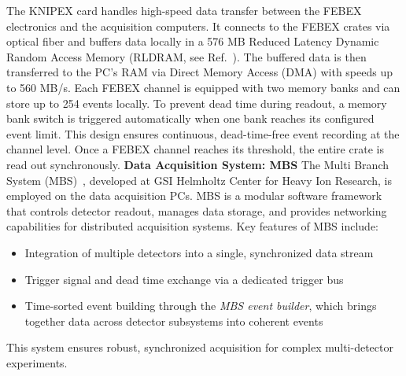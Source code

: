 The KNIPEX card handles high-speed data transfer between the FEBEX electronics and the acquisition computers. It connects to the FEBEX crates via optical fiber and buffers data locally in a 576 MB Reduced Latency Dynamic Random Access Memory (RLDRAM, see Ref.~\cite{jacob2008memory}). The buffered data is then transferred to the PC’s RAM via Direct Memory Access (DMA) with speeds up to 560 MB/s.\newline
Each FEBEX channel is equipped with two memory banks and can store up to 254 events locally. To prevent dead time during readout, a memory bank switch is triggered automatically when one bank reaches its configured event limit. This design ensures continuous, dead-time-free event recording at the channel level. Once a FEBEX channel reaches its threshold, the entire crate is read out synchronously.\newline
\textbf{Data Acquisition System: MBS}\newline
The Multi Branch System (MBS)~\cite{mbsweb}, developed at GSI Helmholtz Center for Heavy Ion Research, is employed on the data acquisition PCs. MBS is a modular software framework that controls detector readout, manages data storage, and provides networking capabilities for distributed acquisition systems.\newline
Key features of MBS include:
\begin{itemize}
\item Integration of multiple detectors into a single, synchronized data stream
\item Trigger signal and dead time exchange via a dedicated trigger bus
\item Time-sorted event building through the \textit{MBS event builder}, which brings together data across detector subsystems into coherent events
\end{itemize}
This system ensures robust, synchronized acquisition for complex multi-detector experiments.


